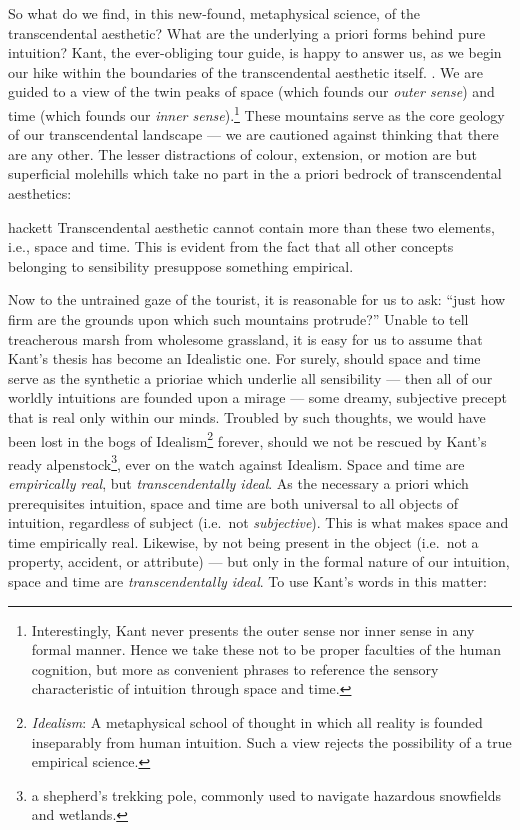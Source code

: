 So what do we find, in this new-found, metaphysical science, of the transcendental aesthetic? What are the underlying a priori forms behind pure intuition? Kant, the ever-obliging tour guide, is happy to answer us, as we begin our hike within the boundaries of the transcendental aesthetic itself. . We are guided to a view of the twin peaks of space (which founds our \emph{outer sense}) and time (which founds our \emph{inner sense}).\footnote{Interestingly, Kant never presents the outer sense nor inner sense in any formal manner. Hence we take these not to be proper faculties of the human cognition, but more as convenient phrases to reference the sensory characteristic of intuition through space and time.} These mountains serve as the core geology of our transcendental landscape --- we are cautioned against thinking that there are any other. The lesser distractions of colour, extension, or motion are but superficial molehills which take no part in the a priori bedrock of transcendental aesthetics:

\begin{displaycquote}[B58]{hackett}
  Transcendental aesthetic cannot contain more than these two elements, i.e., space and time. This is evident from the fact that all other concepts belonging to sensibility presuppose something empirical.
\end{displaycquote}

Now to the untrained gaze of the tourist, it is reasonable for us to ask: \enquote{just how firm are the grounds upon which such mountains protrude?} Unable to tell treacherous marsh from wholesome grassland, it is easy for us to assume that Kant's thesis has become an Idealistic one. For surely, should space and time serve as the synthetic a prioriae which underlie all sensibility --- then all of our worldly intuitions are founded upon a mirage --- some dreamy, subjective precept that is real only within our minds. Troubled by such thoughts, we would have been lost in the bogs of Idealism\footnote{\emph{Idealism}: A metaphysical school of thought in which all reality is founded inseparably from human intuition. Such a view rejects the possibility of a true empirical science.} forever, should we not be rescued by Kant's ready alpenstock\footnote{a shepherd's trekking pole, commonly used to navigate hazardous snowfields and wetlands.}, ever on the watch against Idealism. Space and time are \emph{empirically real}, but \emph{transcendentally ideal}. As the necessary a priori which prerequisites intuition, space and time are both universal to all objects of intuition, regardless of subject (i.e.\ not \emph{subjective}). This is what makes space and time empirically real. Likewise, by not being present in the object (i.e.\ not a property, accident, or attribute) --- but only in the formal nature of our intuition, space and time are \emph{transcendentally ideal}. To use Kant's words in this matter:

